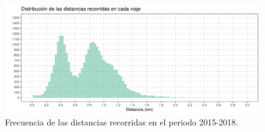\begin{figure}[H]
    \centering
    \includegraphics[width=16cm]{Graphics/distribution_distance.png}
    \caption{Frecuencia de las distancias recorridas en el periodo 2015-2018.}
    \label{fig:distribution_distances}
\end{figure}